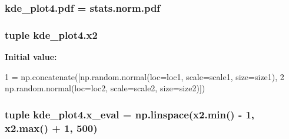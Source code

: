 \subsubsection[{pdf}]{\setlength{\rightskip}{0pt plus 5cm}kde\+\_\+plot4.\+pdf = stats.\+norm.\+pdf}\label{namespacekde__plot4_a3fcf50e40bf645f4cdd0418766bc77ae}
\hypertarget{namespacekde__plot4_a5685a6f3a65c974be74b68de043b0cb1}{}
\subsubsection[{x2}]{\setlength{\rightskip}{0pt plus 5cm}tuple kde\+\_\+plot4.\+x2}\label{namespacekde__plot4_a5685a6f3a65c974be74b68de043b0cb1}
{\bfseries Initial value\+:}
\begin{DoxyCode}
1 = np.concatenate([np.random.normal(loc=loc1, scale=scale1, size=size1),
2                      np.random.normal(loc=loc2, scale=scale2, size=size2)])
\end{DoxyCode}
\hypertarget{namespacekde__plot4_a5da9f162e7d9d864ade43526c1123302}{}
\subsubsection[{x\+\_\+eval}]{\setlength{\rightskip}{0pt plus 5cm}tuple kde\+\_\+plot4.\+x\+\_\+eval = np.\+linspace({\bf x2.\+min}() -\/ 1, {\bf x2.\+max}() + 1, 500)}\label{namespacekde__plot4_a5da9f162e7d9d864ade43526c1123302}
